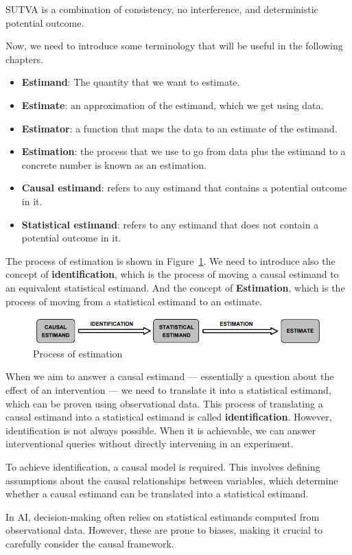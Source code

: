 SUTVA is a combination of consistency, no interference, and deterministic potential
outcome.

Now, we need to introduce some terminology that will be useful in the following
chapters.
\begin{itemize}
    \item \textbf{Estimand}: The quantity that we want to estimate.
    \item \textbf{Estimate}: an approximation of the estimand, which we get
          using data.
    \item \textbf{Estimator}: a function that maps the data to an estimate of the
          estimand.
    \item \textbf{Estimation}: the process that we use to go from data plus the
          estimand to a concrete number is known as an estimation.
    \item \textbf{Causal estimand}: refers to any estimand that contains a potential
          outcome in it.
    \item \textbf{Statistical estimand}: refers to any estimand that does not contain
          a potential outcome in it.
\end{itemize}

The process of estimation is shown in Figure~\ref{fig:pipeline}. We need to
introduce also the concept of \textbf{identification}, which is the process of
moving a causal estimand to an equivalent statistical estimand. And the concept
of \textbf{Estimation}, which is the process of moving from a statistical estimand
to an estimate.
\begin{figure}[!ht]
    \centering
    \includegraphics[width=\textwidth]{img/potential_outcomes/process.png}
    \caption{Process of estimation}
    \label{fig:pipeline}
\end{figure}

When we aim to answer a causal estimand — essentially a question about the effect
of an intervention — we need to translate it into a statistical estimand, which
can be proven using observational data. This process of translating a causal
estimand into a statistical estimand is called \textbf{identification}. However,
identification is not always possible. When it is achievable, we can answer
interventional queries without directly intervening in an experiment.

To achieve identification, a causal model is required. This involves defining
assumptions about the causal relationships between variables, which determine
whether a causal estimand can be translated into a statistical estimand.

In AI, decision-making often relies on statistical estimands computed from
observational data. However, these are prone to biases, making it crucial to
carefully consider the causal framework.